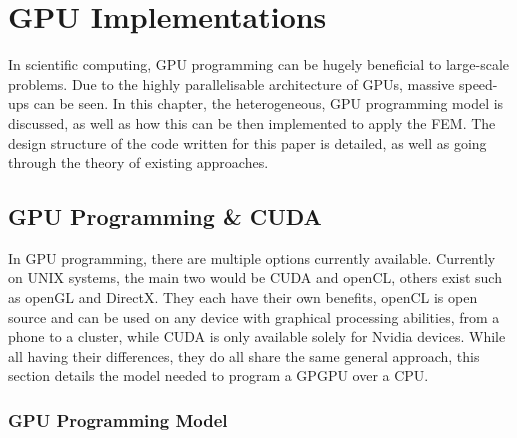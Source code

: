 \clearpage
\chapter{GPU Implementations}

In scientific computing, GPU programming can be hugely beneficial to large-scale problems. Due to the highly parallelisable architecture of GPUs, massive speed-ups can be seen. In this chapter, the heterogeneous, GPU programming model is discussed, as well as how this can be then implemented to apply the FEM. The design structure of the code written for this paper is detailed, as well as going through the theory of existing approaches.

\section{GPU Programming \& CUDA}

In GPU programming, there are multiple options currently available. Currently on UNIX systems, the main two would be CUDA and openCL, others exist such as openGL and DirectX. They each have their own benefits, openCL is open source and can be used on any device with graphical processing abilities, from a phone to a cluster, while CUDA is only available solely for Nvidia devices. While all having their differences, they do all share the same general approach, this section details the model needed to program a GPGPU over a CPU.

\subsection{GPU Programming Model}\label{gpu_model}

